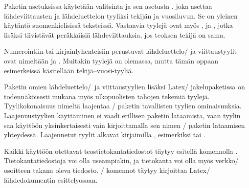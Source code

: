 \begin{esimerkki*}

\begin{koodilohko}
\usepackage{polyglossia} \setdefaultlanguage{finnish}

\usepackage{csquotes}

\usepackage[style=authoryear]{biblatex}
\end{koodilohko}
  \caption{\-/ paketin käyttöönotto ja asetuksia}
  \label{esim/biblatex-käyttöönotto}
\end{esimerkki*}

Paketin asetuksissa käytetään valitsinta  ja sen asetusta
, joka asettaa lähdeviittausten ja lähdeluettelon
tyyliksi tekijän ja vuosiluvun. Se on yleinen käytäntö suomenkielisissä
teksteissä. Vastaavia tyylejä ovat myös ,
 ja , jotka lisäksi
tiivistävät peräkkäisiä lähdeviittauksia, jos teoksen tekijä on sama.

Numerointiin tai kirjainlyhenteisiin perustuvat lähdeluettelo\-/{} ja
viittaustyylit ovat nimeltään  ja
. Muitakin tyylejä on olemassa, mutta tämän
oppaan esimerkeissä käsitellään tekijä--vuosi-tyyliä.

Paketin omien lähdeluettelo\-/\ ja viittaustyylien lisäksi Latex\-/
jakelupaketissa on todennäköisesti mukana myös ulkopuolisten tahojen
tekemiä tyylejä. Tyylikokonaisuus nimeltä 
laajentaa \-/ paketin tavallisten tyylien
ominaisuuksia. Laajennustyylien käyttäminen ei vaadi erillisen paketin
lataamista, vaan tyylin saa käyttöön yksinkertaisesti vain
kirjoittamalla sen nimen \-/ paketin lataamisen
yhteydessä. Laajennetut tyylit alkavat kirjaimilla \mbox{,}
esimerkiksi  tai .

Kaikki käyttöön otettavat teostietokantatiedostot täytyy esitellä
komennolla . Tietokantatiedostoja voi olla
useampiakin, ja tietokanta voi olla myös verkko\-/ osoitteen takana
oleva tiedosto. \-/ komennot täytyy kirjoittaa
Latex\-/ lähdedokumentin esittelyosaan.

